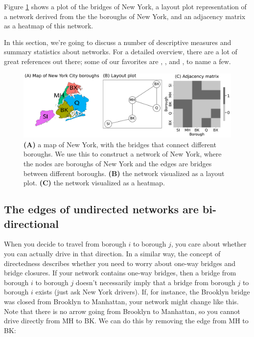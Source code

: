 Figure \ref{fig:ch4:nyc_ex} shows a plot of the bridges of New York, a layout plot representation of a network derived from the the boroughs of New York, and an adjacency matrix as a heatmap of this network.

In this section, we're going to discuss a number of descriptive measures and summary statistics about networks. For a detailed overview, there are a lot of great references out there; some of our favorites are \cite{Barabsi2013Mar}, \cite{Gross2005Sep}, and \cite{Newman2006Jun}, to name a few.

\begin{figure}
    \centering
    \includegraphics[width=\linewidth]{representations/ch4/Images/nyc_ex.png}
    \caption[New York City borough example]{\textbf{(A)} a map of New York, with the bridges that connect different boroughs. We use this to construct a network of New York, where the nodes are boroughs of New York and the edges are bridges between different boroughs. \textbf{(B)} the network visualized as a layout plot. \textbf{(C)} the network visualized as a heatmap.}
    \label{fig:ch4:nyc_ex}
\end{figure}

\subsection{The edges of undirected networks are bi-directional}

When you decide to travel from borough $i$ to borough $j$, you care about whether you can {actually drive} in that direction. In a similar way, the concept of directedness describes whether you need to worry about one-way bridges and bridge closures. If your network contains one-way bridges, then a bridge from borough $i$ to borough $j$ doesn't {necessarily} imply that a bridge from borough $j$ to borough $i$ exists (just ask New York drivers). If, for instance, the Brooklyn bridge was closed from Brooklyn to Manhattan, your network might change like this. Note that there is no arrow going from Brooklyn to Manhattan, so you cannot drive directly from MH to BK. We can do this by removing the edge from MH to BK:

